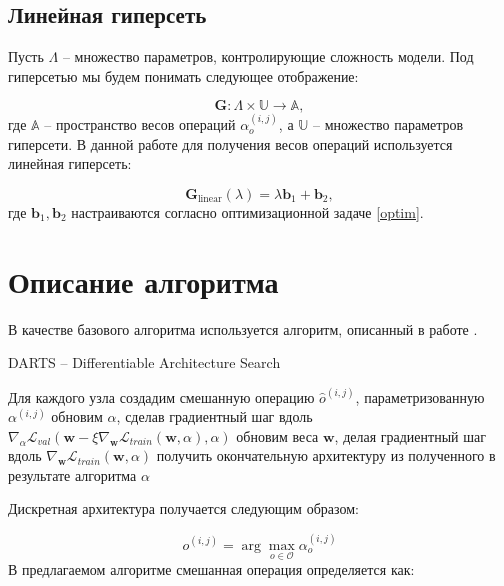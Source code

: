 \documentclass[12pt, twoside]{article}
\begin{document}
\subsection{Линейная гиперсеть}

Пусть $\Lambda$ --  множество параметров, контролирующие сложность модели. Под гиперсетью мы будем понимать следующее отображение:

\begin{equation}
	\mathbf{G} : \Lambda \times \mathbb{U} \rightarrow \mathbb{A},
\end{equation}
где $\mathbb{A}$ -- пространство весов операций $\alpha^{(i, j)}_o$, а $\mathbb{U}$ -- множество параметров гиперсети.
В данной работе для получения весов операций используется линейная гиперсеть:
 
 \begin{equation}\label{hypernet}
 \mathbf{G}_{\text{linear}}(\lambda) = \lambda \mathbf{b}_1 + \mathbf{b}_2,
 \end{equation}
 где $\mathbf{b}_1, \mathbf{b}_2$ настраиваются согласно оптимизационной задаче \ref{optim}.

\section{Описание алгоритма}
 В качестве базового алгоритма используется алгоритм, описанный в работе \cite{journals/corr/abs-1806-09055}.
 
 \begin{algorithm}[H]
\begin{algorithmic}[1]
\caption{DARTS -- Differentiable Architecture Search}
\label{alg:darts}
\STATE Для каждого узла создадим смешанную операцию $\hat{o}^{(i, j)}$, параметризованную $\alpha^{(i, j)}$
\STATE  обновим $\alpha$, сделав градиентный шаг вдоль $\nabla_\alpha \mathcal{L}_{val}(\mathbf{w} - \xi\nabla_{\mathbf{w}}\mathcal{L}_{train}(\mathbf{w}, \alpha), \alpha)$
\STATE обновим веса $\mathbf{w}$, делая градиентный шаг вдоль $\nabla_\mathbf{w}\mathcal{L}_{train}(\mathbf{w}, \alpha)$
\ENDWHILE
\STATE получить окончательную архитектуру из полученного в результате алгоритма $\alpha$
\end{algorithmic}
\end{algorithm}
Дискретная архитектура получается следующим образом:

$$o^{(i, j)} =\arg\max_{o\in\mathcal{O}}\alpha_o^{(i, j)}$$
В предлагаемом алгоритме смешанная операция определяется как:
 
\end{document}
